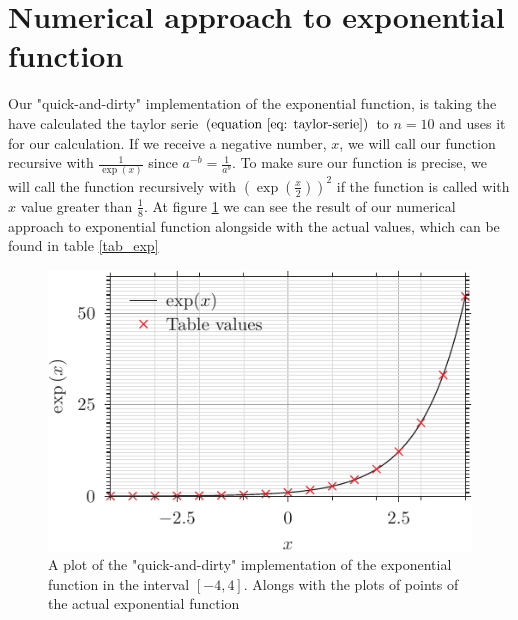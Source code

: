 \documentclass[12pt, twocolumn, a4paper]{article}
\begin{document}
\section{Numerical approach to exponential function}
Our "quick-and-dirty" implementation of the exponential function, is taking the have calculated the taylor serie $\left(\text{equation \eqref{eq: taylor-serie}} \right)$ to $n=10$ and uses it for our calculation.
If we receive a negative number, $x$, we will call our function recursive with $\frac{1}{\exp \left(x \right)}$ since $a^{-b} = \frac{1}{a^{b}}$. To make sure our function is precise, we will call the function recursively with $\left( \exp \left( \frac{x}{2} \right) \right)^{2}$ if the function is called with $x$ value greater than $\frac{1}{8}$.
At figure \ref{fig:exp_dirty-approach} we can see the result of our numerical approach to exponential function alongside with the actual values, which can be found in table \ref{tab_exp}
\begin{figure} \label{fig:exp_dirty-approach}
	\includegraphics[width=\columnwidth]{exp_pyx.pdf}
	\caption{A plot of the "quick-and-dirty" implementation of the exponential function in the interval $\left[-4, 4\right]$. Alongs with the plots of points of the actual exponential function}
\end{figure}
\end{document}
